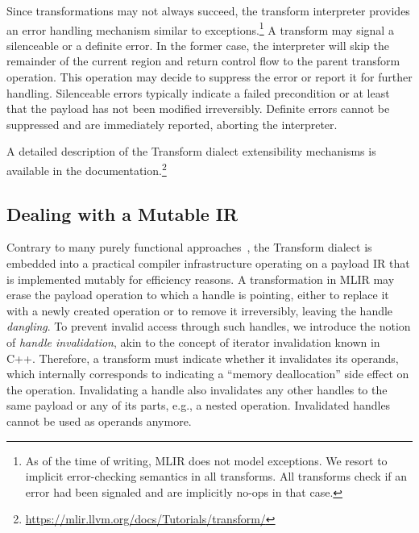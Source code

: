 \documentclass[screen,nonacm,authorversion]{acmart}
\begin{document}
Since transformations may not always succeed, the transform interpreter provides an error handling mechanism similar to exceptions.\footnote{As of the time of writing, MLIR does not model exceptions. We resort to implicit error-checking semantics in all transforms. All transforms check if an error had been signaled and are implicitly no-ops in that case.} A transform may signal a silenceable or a definite error. In the former case, the interpreter will skip the remainder of the current region and return control flow to the parent transform operation. This operation may decide to suppress the error or report it for further handling. Silenceable errors typically indicate a failed precondition or at least that the payload has not been modified irreversibly. Definite errors cannot be suppressed and are immediately reported, aborting the interpreter.

A detailed description of the Transform dialect extensibility mechanisms is available in the documentation.\footnote{\url{https://mlir.llvm.org/docs/Tutorials/transform/}}%

































\subsection{Dealing with a Mutable IR}
\label{sec:handle_invalidation}
Contrary to many purely functional approaches~\cite{lift,rise,egg}, the Transform dialect is embedded into a practical compiler infrastructure operating on a payload IR that is implemented mutably for efficiency reasons. A transformation in MLIR may erase the payload operation to which a handle is pointing, either to replace it with a newly created operation or to remove it irreversibly, leaving the handle \emph{dangling}.
To prevent invalid access through such handles, we introduce the notion of \emph{handle invalidation}, akin to the concept of iterator invalidation known in C++.
Therefore, a transform must indicate whether it invalidates its operands, which internally corresponds to indicating a ``memory deallocation'' side effect on the operation.
Invalidating a handle also invalidates any other handles to the same payload or any of its parts, e.g., a nested operation.
Invalidated handles cannot be used as operands anymore.
\end{document}
